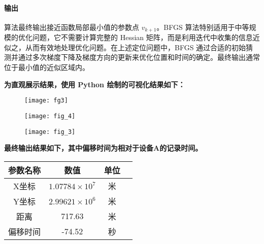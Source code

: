 \documentclass[withoutpreface,bwprint,12pt,a4paper]{cumcmthesis}
\begin{document}
\paragraph{输出}  
算法最终输出接近函数局部最小值的参数点 \(v_{k+1}\)。BFGS 算法特别适用于中等规模的优化问题，它不需要计算完整的 Hessian 矩阵，而是利用迭代中收集的信息近似之，从而有效地处理优化问题。在上述定位问题中，BFGS 通过合适的初始猜测并通过多次梯度下降及梯度方向的更新来优化位置和时间的确定。最终输出通常位于最小值的近似区域内。


\textbf{为直观展示结果，使用 Python 绘制的可视化结果如下：}

\begin{figure}[!htbp]
    \centering
    \texttt{[image: fg3]}
	    \caption{} %
\end{figure}

\begin{figure}[H]
    \centering
    \begin{minipage}{0.48\textwidth}
        \centering
        \texttt{[image: fig\_4]}
        \caption{} %
        \label{fig:4} %
    \end{minipage}
    \hfill %
    \begin{minipage}{0.48\textwidth}
        \centering
        \texttt{[image: fig\_3]}
        \caption{} %
        \label{fig:3} %
    \end{minipage}
\end{figure}



\textbf{最终输出结果如下，其中偏移时间为相对于设备A的记录时间。}


\begin{table}[ht]
\centering %
\begin{tabular}{cccc}
\toprule
参数名称 & 数值 & 单位 \\
\midrule
X坐标 & \(1.07784 \times 10^7\) & 米 \\
Y坐标 & \(2.99621 \times 10^6\) & 米 \\
距离 & 717.63 & 米 \\
偏移时间 & -74.52 & 秒 \\
\bottomrule
\end{tabular}
\end{table}
\end{document}
